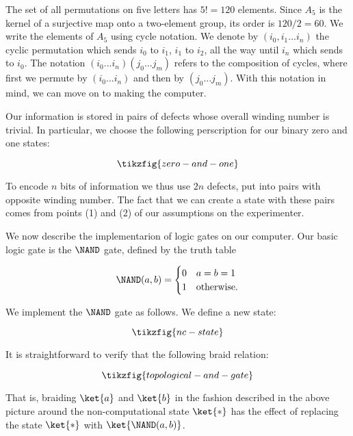 The set of all permutations on five letters has $5!=120$ elements. Since $A_5$ is the kernel of a surjective map onto a two-element group, its order is $120/2=60$. We write the elements of $A_5$ using cycle notation. We denote by $(i_0,i_1...i_n)$ the cyclic permutation which sends $i_0$ to $i_1$, $i_1$ to $i_2$, all the way until $i_n$ which sends to $i_0$. The notation $(i_0...i_n)(j_0...j_m)$ refers to the composition of cycles, where first we permute by $(i_0...i_n)$ and then by $(j_0...j_m)$. With this notation in mind, we can move on to making the computer.

Our information is stored in pairs of defects whose overall winding number is trivial. In particular, we choose the following perscription for our binary zero and one states:

\begin{equation*}
\tikzfig{zero-and-one}
\end{equation*}

To encode $n$ bits of information we thus use $2n$ defects, put into pairs with opposite winding number. The fact that we can create a state with these pairs comes from points (1) and (2) of our assumptions on the experimenter.

We now describe the implementarion of logic gates on our computer. Our basic logic gate is the $\NAND$ gate, defined by the truth table

\begin{centering}
\[
\NAND(a,b)=
\begin{cases}
0 & a=b=1 \\
1 & \text{otherwise}.
\end{cases}
\]
\end{centering}

We implement the $\NAND$ gate as follows. We define a new state:

\begin{equation*}
\tikzfig{nc-state}
\end{equation*}

It is straightforward to verify that the following braid relation:

\begin{equation*}
\tikzfig{topological-and-gate}
\end{equation*}

That is, braiding $\ket{a}$ and $\ket{b}$ in the fashion described in the above picture around the non-computational state $\ket{*}$ has the effect of replacing the state $\ket{*}$ with $\ket{\NAND(a,b)}$.


